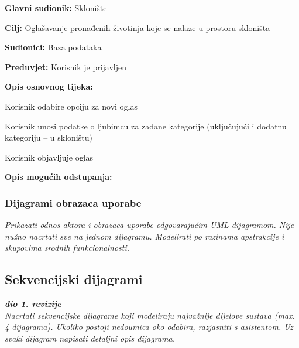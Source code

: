 					\pagebreak
					\noindent {}
					\begin{packed_item}
						
						\item \textbf{Glavni sudionik: }Sklonište
						\item  \textbf{Cilj:} Oglašavanje pronađenih životinja koje se nalaze u prostoru skloništa
						\item  \textbf{Sudionici:} Baza podataka
						\item  \textbf{Preduvjet:} Korisnik je prijavljen
						\item  \textbf{Opis osnovnog tijeka:}
						
						\item[] \begin{packed_enum}
							
							\item Korisnik odabire opciju za novi oglas
							\item Korisnik unosi podatke o ljubimcu za zadane kategorije (uključujući i dodatnu kategoriju – u skloništu)
							\item Korisnik objavljuje oglas
						\end{packed_enum}
						
						\item  \textbf{Opis mogućih odstupanja:}
						
					\end{packed_item}
					
				
					
				\subsubsection{Dijagrami obrazaca uporabe}
					
					\textit{Prikazati odnos aktora i obrazaca uporabe odgovarajućim UML dijagramom. Nije nužno nacrtati sve na jednom dijagramu. Modelirati po razinama apstrakcije i skupovima srodnih funkcionalnosti.}
				\eject		
				
			\subsection{Sekvencijski dijagrami}
				
				\textbf{\textit{dio 1. revizije}}\\
				
				\textit{Nacrtati sekvencijske dijagrame koji modeliraju najvažnije dijelove sustava (max. 4 dijagrama). Ukoliko postoji nedoumica oko odabira, razjasniti s asistentom. Uz svaki dijagram napisati detaljni opis dijagrama.}
				\eject
	
